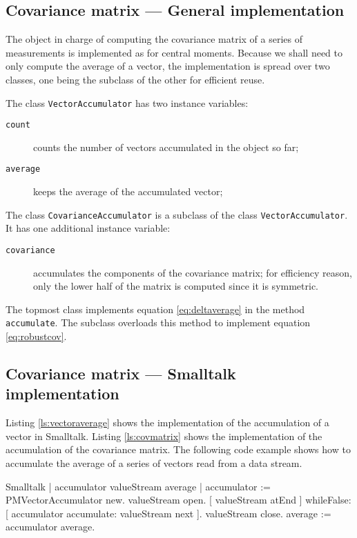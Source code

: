 \subsection{Covariance matrix --- General implementation}
 The
object in charge of computing the covariance matrix of a series of
measurements is implemented as for central moments. Because we
shall need to only compute the average of a vector, the
implementation is spread over two classes, one being the subclass
of the other for efficient reuse.

\noindent The class \texttt{VectorAccumulator} has two instance
variables: {} {\parskip 0pt
\begin{description}
  \item[\texttt{count}] counts the number of vectors accumulated in the object so far;
  \item[\texttt{average}] keeps the average of the accumulated vector;
\end{description}
}

\noindent The class \texttt{CovarianceAccumulator} is a subclass of
the class \texttt{VectorAccumulator}. It has one additional instance
variable: {} {\parskip 0pt
\begin{description}
  \item[\texttt{covariance}] accumulates the components of the covariance
  matrix; for efficiency reason, only the lower half of the matrix
  is computed since it is symmetric.
\end{description}
}

The topmost class implements equation \ref{eq:deltaverage} in the
method \texttt{accumulate}. The subclass overloads this method to
implement equation \ref{eq:robustcov}.

\subsection{Covariance matrix --- Smalltalk implementation}
\label{sec:scovmatrix} Listing \ref{ls:vectoraverage} shows the
implementation of the accumulation of a vector in Smalltalk.
Listing \ref{ls:covmatrix} shows the implementation of the
accumulation of the covariance matrix. The following code example
shows how to accumulate the average of a series of vectors read
from a data stream.

\begin{listing}{Smalltalk}
{ }
 | accumulator valueStream average |
 accumulator := PMVectorAccumulator new.
 valueStream open.
 [ valueStream atEnd ]
        whileFalse: [ accumulator accumulate: valueStream next ].
 valueStream close.
 average := accumulator average.
\end{listing}

